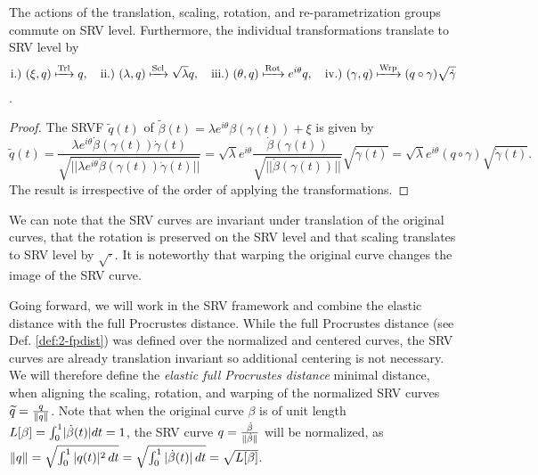 \begin{lemma}
  \label{lem:2-transf}
  The actions of the translation, scaling, rotation, and re-parametrization groups commute on SRV level.
  Furthermore, the individual transformations translate to SRV level by 
  \begin{equation*}
    \text{i.)} \,\,(\xi, q) \xmapsto{\text{Trl}} q,\quad 
    \text{ii.)} \,\, (\lambda, q) \xmapsto{\text{Scl}} \sqrt\lambda q,\quad
    \text{iii.)} \,\, (\theta, q) \xmapsto{\text{Rot}} e^{i\theta} q,\quad
    \text{iv.)} \,\, (\gamma, q) \xmapsto{\text{Wrp}} (q \circ \gamma) \sqrt{\dot\gamma}
  \end{equation*}
  \parencite[see e.g.][142]{SrivastavaKlassen2016}.
\begin{proof} The SRVF $\widetilde q(t)$ of  $\widetilde\beta(t) = \lambda e^{i\theta}\beta\left(\gamma(t)\right) + \xi$ is given by
$$ \widetilde q (t) 
  = \frac{\lambda e^{i\theta} \dot\beta\left(\gamma(t)\right) \dot\gamma(t)}{\sqrt{||\lambda e^{i\theta} \dot\beta\left(\gamma(t)\right) \dot\gamma(t)||}} 
  = \sqrt{\lambda} e^{i\theta} \frac{\dot\beta\left(\gamma(t)\right)}{\sqrt{||\dot\beta\left(\gamma(t)\right)||}} \sqrt{\dot\gamma(t)} 
  = \sqrt\lambda e^{i\theta} \left( q \circ \gamma \right) \sqrt{\dot\gamma(t)}.$$
The result is irrespective of the order of applying the transformations.
\end{proof}
\end{lemma}

\noindent We can note that the SRV curves are invariant under translation of the original curves, that the rotation is preserved on the SRV level and that scaling translates to SRV level by $\sqrt{\cdot}$.
It is noteworthy that warping the original curve changes the image of the SRV curve.

Going forward, we will work in the SRV framework and combine the elastic distance with the full Procrustes distance.
While the full Procrustes distance (see Def. \ref{def:2-fpdist}) was defined over the normalized and centered curves, the SRV curves are already translation invariant so additional centering is not necessary.
We will therefore define the \emph{elastic full Procrustes distance} minimal distance, when aligning the scaling, rotation, and warping of the normalized SRV curves $\widetilde q = \frac{q}{\lVert q\rVert}$.
Note that when the original curve $\beta$ is of unit length $L[\beta] = \int_0^1 \lvert\dot\beta(t)\rvert dt = 1$, the SRV curve $q = \frac{\dot\beta}{\lVert\dot\beta\rVert}$ will be normalized, as $ \lVert q\rVert = \sqrt{ \int_0^1 |q(t)|^2 \, dt} = \sqrt{\int_0^1 |\dot{\beta}(t)| \, dt} = \sqrt{L[\beta]}$.

